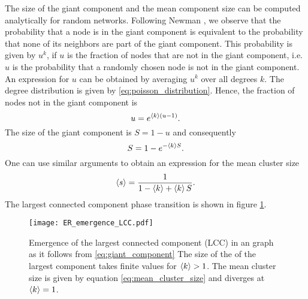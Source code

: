 \documentclass[openright,twoside,headsepline]{scrbook}
\begin{document}
The size of the giant component and the mean component size can be computed analytically for random networks.
Following Newman \citep{Newman2003}, we observe that the probability that a node is in the giant component is equivalent to the probability that none of its neighbors are part of the giant component.
This probability is given by $u^k$, if $u$ is the fraction of nodes that are not in the giant component, i.e. $u$ is the probability that a randomly chosen node is not in the giant component.
An expression for $u$ can be obtained by averaging $u^k$ over all degrees $k$.
The degree distribution is given by \eqref{eq:poisson_distribution}.
Hence, the fraction of nodes not in the giant component is
\[
u=e^{\left< k \right>(u-1)}.
\]
The size of the giant component is $S=1-u$ and consequently
\begin{equation}\label{eq:giant_component}
S=1-e^{-\left< k \right>S}.
\end{equation}
One can use similar arguments to obtain an expression for the mean cluster size \citep{Newman2003}
\begin{equation}\label{eq:mean_cluster_size}
\left< s \right>=\frac{1}{1-\left< k \right>+\left< k \right>S}.
\end{equation}
%
The largest connected component phase transition is shown in figure \ref{fig:ER_lcc_emergence}.
\begin{SCfigure}
\texttt{[image: ER\_emergence\_LCC.pdf]}
\caption{Emergence of the largest connected component (LCC) in an \ER graph as it follows from \eqref{eq:giant_component}
The size of the of the largest component takes finite values for $\left< k \right>>1$.
The mean cluster size is given by equation \eqref{eq:mean_cluster_size} and diverges at $\left< k \right>=1$.
}
\label{fig:ER_lcc_emergence}
\end{SCfigure}
%
\end{document}
